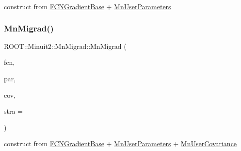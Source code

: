 construct from \mbox{\hyperlink{classROOT_1_1Minuit2_1_1FCNGradientBase}{F\+C\+N\+Gradient\+Base}} + \mbox{\hyperlink{classROOT_1_1Minuit2_1_1MnUserParameters}{Mn\+User\+Parameters}} 

\mbox{\label{classROOT_1_1Minuit2_1_1MnMigrad_a1c12d5f8210b36cdc555b341f6005c8d}} 
\subsubsection{\texorpdfstring{MnMigrad()}{MnMigrad()}\hspace{0.1cm}{\footnotesize\ttfamily [11/39]}}
{\footnotesize\ttfamily R\+O\+O\+T\+::\+Minuit2\+::\+Mn\+Migrad\+::\+Mn\+Migrad (\begin{DoxyParamCaption}\item[{const \mbox{\hyperlink{classROOT_1_1Minuit2_1_1FCNGradientBase}{F\+C\+N\+Gradient\+Base}} \&}]{fcn,  }\item[{const \mbox{\hyperlink{classROOT_1_1Minuit2_1_1MnUserParameters}{Mn\+User\+Parameters}} \&}]{par,  }\item[{const \mbox{\hyperlink{classROOT_1_1Minuit2_1_1MnUserCovariance}{Mn\+User\+Covariance}} \&}]{cov,  }\item[{unsigned int}]{stra = {} }\end{DoxyParamCaption})\hspace{0.3cm}{\ttfamily [inline]}}



construct from \mbox{\hyperlink{classROOT_1_1Minuit2_1_1FCNGradientBase}{F\+C\+N\+Gradient\+Base}} + \mbox{\hyperlink{classROOT_1_1Minuit2_1_1MnUserParameters}{Mn\+User\+Parameters}} + \mbox{\hyperlink{classROOT_1_1Minuit2_1_1MnUserCovariance}{Mn\+User\+Covariance}} 

\mbox{\label{classROOT_1_1Minuit2_1_1MnMigrad_a0397e5984ab0d0163e69315b40a3d520}} 
